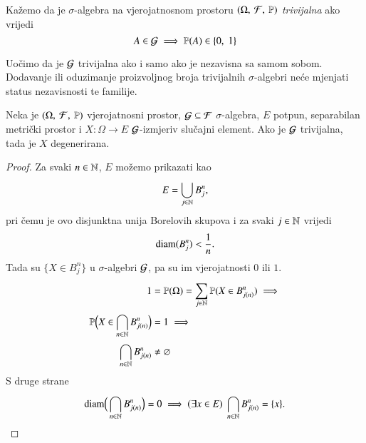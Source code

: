 \begin{defn}    \label{defn:9.5}
    Ka\v zemo da je $\sigma$-algebra na vjerojatnosnom prostoru $(\Omega, \: \mathcal{F}, \: \mathbb{P})$ \emph{trivijalna} ako vrijedi
    \begin{equation*}
        A \in \mathcal{G} \implies \mathbb{P}({A}) \in \{0, \; 1\}
    \end{equation*}
\end{defn}

Uo\v cimo da je $\mathcal{G}$ trivijalna ako i samo ako je nezavisna sa samom sobom.
Dodavanje ili oduzimanje proizvoljnog broja trivijalnih $\sigma$-algebri ne\' ce mjenjati status nezavisnosti te familije.

\begin{lm}  \label{lm:9.6}
    Neka je $(\Omega, \: \mathcal{F}, \: \mathbb{P})$ vjerojatnosni prostor, $\mathcal{G} \subseteq \mathcal{F}$ $\sigma$-algebra, $E$ potpun, separabilan metri\v cki prostor i $X : \Omega \to E$ $\mathcal{G}$-izmjeriv slu\v cajni element.
    Ako je $\mathcal{G}$ trivijalna, tada je $X$ degenerirana.
\end{lm}

\begin{proof}
    Za svaki $n \in \mathbb{N}$, $E$ mo\v zemo prikazati kao
    \begin{equation*}
        E = \bigcup\limits_{j \in \mathbb{N}}^{} B_j^n,
    \end{equation*}
    pri \v cemu je ovo disjunktna unija Borelovih skupova i za svaki $j \in \mathbb{N}$ vrijedi
    \begin{equation*}
        \mathrm{diam}(B_j^n) < \frac{1}{n}.
    \end{equation*}
    Tada su $\{ X \in B_j^n \}$ u $\sigma$-algebri $\mathcal{G}$, pa su im vjerojatnosti $0$ ili $1$.
    \begin{equation*}
        \begin{aligned}
            1 &= \mathbb{P}({\Omega}) = \sum\limits_{j \in \mathbb{N}}^{} \mathbb{P}({X \in B_{j(n)}^n}) \implies\\
            \mathbb{P} \Big( X \in \bigcap\limits_{n \in \mathbb{N}}^{} B_{j(n)}^n \Big) &= 1 \implies\\
            \bigcap\limits_{n \in \mathbb{N}}^{} B_{j(n)}^n &\neq \varnothing
        \end{aligned}
    \end{equation*}
    S druge strane
    \begin{equation*}
        \mathrm{diam}\Big( \bigcap\limits_{n \in \mathbb{N}}^{}B_{j(n)}^n \Big) = 0 \implies (\exists x \in E) \; \bigcap\limits_{n \in \mathbb{N}}^{} B_{j(n)}^n = \{ x \}.
    \end{equation*}
\end{proof}

